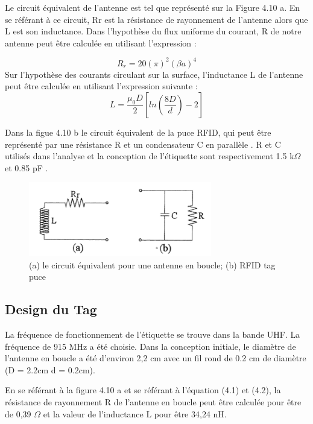 \documentclass[11pt, a4paper, twoside]{book}
\begin{document}
Le circuit équivalent de l'antenne est tel que représenté sur la Figure 4.10 a. En se référant à ce circuit, Rr est la résistance de rayonnement de l'antenne alors que L est son inductance. Dans l'hypothèse du flux uniforme du courant, R de notre antenne  peut être calculée en utilisant l'expression \cite{antennatheory}:

\begin{equation}
R_{r}  = 20 (\pi)^{2}(\beta a)^{4}
\end{equation}
Sur l'hypothèse des courants circulant sur la surface, l'inductance L de l'antenne peut être calculée en utilisant l'expression suivante \cite{antennatheory}:
\begin{equation}
L  = \frac{\mu_{0}D}{2}[ln(\frac{8D}{d})-2]
\end{equation}

Dans la figue 4.10 b le circuit équivalent de la puce RFID, qui peut être représenté par une résistance R et un condensateur  C en parallèle . R et C utilisés dans l'analyse et la conception de l'étiquette sont respectivement 1.5 k\(\Omega\) et 0.85 pF .

\begin{figure}[H]
\centering
\includegraphics[width=8cm]{eq}
\caption{(a) le circuit équivalent pour  une antenne en boucle; (b) RFID tag puce}
\end{figure}

\subsection{Design du Tag}
La fréquence de fonctionnement de l'étiquette se trouve dans la bande UHF.
La fréquence de 915 MHz a été choisie. Dans la conception initiale, le diamètre de l'antenne en boucle a été d'environ 2,2 cm avec un fil rond de 0.2 cm de diamètre  (D = 2.2cm d = 0.2cm).

En se référant à la figure 4.10 a et se référant à l'équation (4.1) et (4.2), la résistance de rayonnement R de l'antenne en boucle peut être calculée pour être de 0,39  \(\Omega\) et la valeur de l'inductance L pour être  34,24 nH.\\
\end{document}
